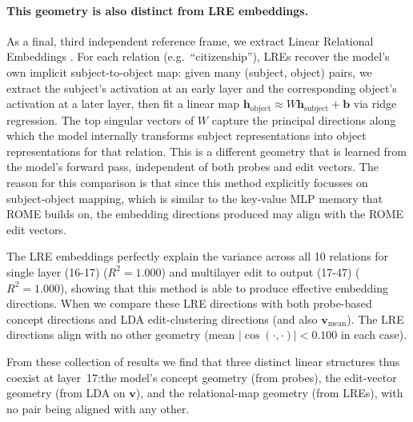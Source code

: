 \documentclass[11pt,a4paper]{article}
\newcommand{\vv}{\mathbf{v}}
\newcommand{\hh}{\mathbf{h}}
\newcommand{\abs}[1]{\lvert #1 \rvert}
\newcommand{\cosim}{\abs{\cos(\cdot,\cdot)}}
\begin{document}
\paragraph{This geometry is also distinct from LRE embeddings.}
As a final, third independent reference frame, we extract Linear Relational Embeddings \citep[LREs;][]{hernandez2024linearity}. For each relation (e.g.\ ``citizenship''), LREs recover the model's own implicit subject-to-object map: given many (subject, object) pairs, we extract the subject's activation at an early layer and the corresponding object's activation at a later layer, then fit a linear map $\hh_{\text{object}} \approx W\hh_{\text{subject}} + \mathbf{b}$ via ridge regression. The top singular vectors of $W$ capture the principal directions along which the model internally transforms subject representations into object representations for that relation. This is a different geometry that is learned from the model's forward pass, independent of both probes and edit vectors.
The reason for this comparison is that since this method explicitly focusses on subject-object mapping, which is similar to the key-value MLP memory that ROME builds on, the embedding directions produced may align with the ROME edit vectors.

The LRE embeddings perfectly explain the variance across all 10 relations for single layer (16-17)  ($R^2=1.000$) and multilayer edit to output (17-47)  ($R^2=1.000$), showing that this method is able to produce effective embedding directions. 
When we compare these LRE directions with both probe-based concept directions and LDA edit-clustering directions (and also  $\vv_\text{mean}$). The LRE directions align with no other geometry (mean $\cosim < 0.100$ in each case). 

From these collection of results we find that three distinct linear structures thus coexist at layer~17:the model's concept geometry (from probes), the edit-vector geometry (from LDA on $\vv$), and the relational-map geometry (from LREs), with no pair being aligned with any other.


\end{document}
